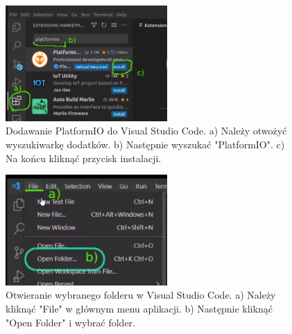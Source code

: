 \documentclass[12pt,oneside,a4paper]{book}
\theoremstyle{break}
\begin{document}
\begin{figure}[H]
    \begin{center}
        \includegraphics[width=0.55\textwidth]{platform-install.png}    
        \caption{Dodawanie PlatformIO do Visual Studio Code. a) Należy otwożyć wyszukiwarkę dodatków.
        b) Następnie wyszukać "PlatformIO". c) Na końcu kliknąć przycisk instalacji.}
        \label{rys:platform-install}
    \end{center}
\end{figure}

\begin{figure}[H]
    \begin{center}
        \includegraphics[width=0.55\textwidth]{vsc-open.png}    
        \caption{Otwieranie wybranego folderu w Visual Studio Code. a) Należy kliknąć "File" w głównym menu aplikacji.
        b) Następnie kliknąć "Open Folder" i wybrać folder.}
        \label{rys:vsc-open}
    \end{center}
\end{figure}
\end{document}
